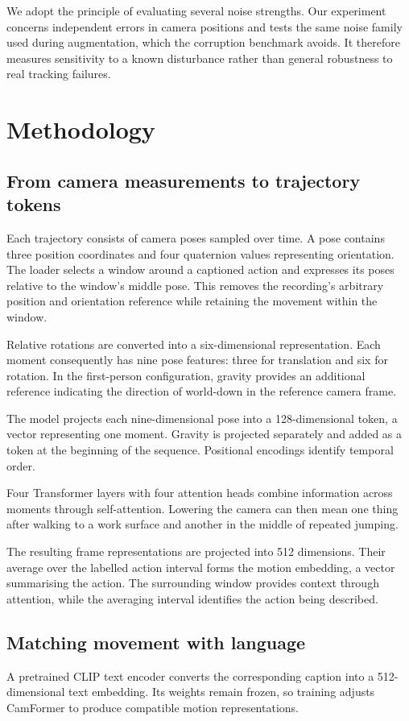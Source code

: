 \documentclass[10pt,twocolumn,letterpaper]{article}
\begin{document}
We adopt the principle of evaluating several noise strengths. Our experiment concerns independent errors in camera
positions and tests the same noise family used during augmentation, which the corruption benchmark avoids. It
therefore measures sensitivity to a known disturbance rather than general robustness to real tracking failures.

\section{Methodology}
\label{sec:method}

\subsection{From camera measurements to trajectory tokens}
Each trajectory consists of camera poses sampled over time. A pose contains three position coordinates and four
quaternion values representing orientation. The loader selects a window around a captioned action and expresses
its poses relative to the window's middle pose. This removes the recording's arbitrary position and orientation
reference while retaining the movement within the window.

Relative rotations are converted into a six-dimensional representation. Each moment consequently has nine pose
features: three for translation and six for rotation. In the first-person configuration, gravity provides an
additional reference indicating the direction of world-down in the reference camera frame.

The model projects each nine-dimensional pose into a 128-dimensional token, a vector representing one moment.
Gravity is projected separately and added as a token at the beginning of the sequence. Positional encodings
identify temporal order.

Four Transformer layers with four attention heads combine information across moments through self-attention. Lowering the camera can then mean one thing after
walking to a work surface and another in the middle of repeated jumping.

The resulting frame representations are projected into 512 dimensions. Their average over the labelled action
interval forms the motion embedding, a vector summarising the action. The surrounding window provides context
through attention, while the averaging interval identifies the action being described.

\subsection{Matching movement with language}
A pretrained CLIP text encoder converts the corresponding caption into a 512-dimensional text embedding. Its
weights remain frozen, so training adjusts CamFormer to produce compatible motion representations.
\end{document}
